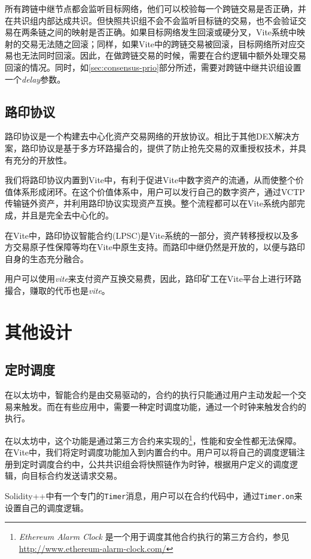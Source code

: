 \documentclass[UTF8,nofonts]{ctexart}
\begin{document}
\begin{multicols}{2}
所有跨链中继节点都会监听目标网络，他们可以校验每一个跨链交易是否正确，并在共识组内部达成共识。但快照共识组不会不会监听目标链的交易，也不会验证交易在两条链之间的映射是否正确。如果目标网络发生回滚或硬分叉，Vite系统中映射的交易无法随之回滚；同样，如果Vite中的跨链交易被回滚，目标网络所对应交易也无法同时回滚。因此，在做跨链交易的时候，需要在合约逻辑中额外处理交易回滚的情况。同时，如\ref{sec:consensus-prio}部分所述，需要对跨链中继共识组设置一个\textit{delay}参数。

\subsection{路印协议}
路印协议\cite{loopring}是一个构建去中心化资产交易网络的开放协议。相比于其他DEX解决方案，路印协议是基于多方环路撮合的，提供了防止抢先交易的双重授权技术，并具有充分的开放性。

我们将路印协议内置到Vite中，有利于促进Vite中数字资产的流通，从而使整个价值体系形成闭环。在这个价值体系中，用户可以发行自己的数字资产，通过VCTP传输链外资产，并利用路印协议实现资产互换。整个流程都可以在Vite系统内部完成，并且是完全去中心化的。

在Vite中，路印协议智能合约(LPSC)是Vite系统的一部分，资产转移授权以及多方交易原子性保障等均在Vite中原生支持。而路印中继仍然是开放的，以便与路印自身的生态充分融合。

用户可以使用\textit{vite}来支付资产互换交易费，因此，路印矿工在Vite平台上进行环路撮合，赚取的代币也是\textit{vite}。

\section{其他设计}
\subsection{定时调度}
在以太坊中，智能合约是由交易驱动的，合约的执行只能通过用户主动发起一个交易来触发。而在有些应用中，需要一种定时调度功能，通过一个时钟来触发合约的执行。

在以太坊中，这个功能是通过第三方合约来实现的\footnote{\textit{Ethereum Alarm Clock} 是一个用于调度其他合约执行的第三方合约，参见 \url{http://www.ethereum-alarm-clock.com/}}，性能和安全性都无法保障。在Vite中，我们将定时调度功能加入到内置合约中。用户可以将自己的调度逻辑注册到定时调度合约中，公共共识组会将快照链作为时钟，根据用户定义的调度逻辑，向目标合约发送请求交易。

Solidity++中有一个专门的\texttt{Timer}消息，用户可以在合约代码中，通过\texttt{Timer.on}来设置自己的调度逻辑。


\end{multicols}
\end{document}
